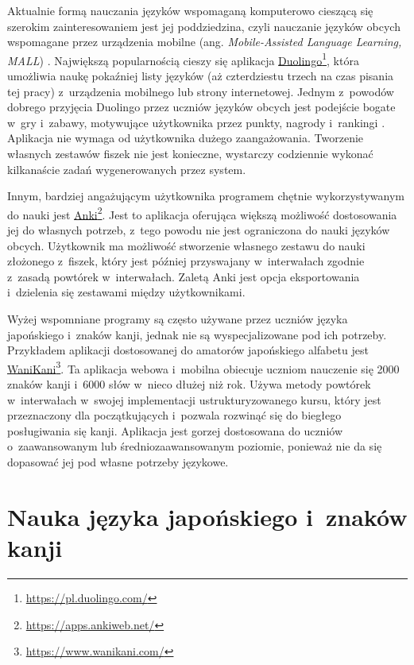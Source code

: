 \documentclass[a4paper,twoside,12pt]{book}
\newcommand{\obcy}[1]{\emph{#1}}
\newcommand{\english}[1]{{\selectlanguage{british}\obcy{#1}}}
\begin{document}
Aktualnie formą nauczania języków wspomaganą komputerowo cieszącą się szerokim zainteresowaniem jest jej poddziedzina, czyli nauczanie języków obcych wspomagane przez urządzenia mobilne (ang. \english{Mobile-Assisted Language Learning, MALL}) \cite{bib:artykulDuolingo}. Największą popularnością \cite{bib:internetDuolingo,bib:artykulDuolingo} cieszy się aplikacja \href{https://pl.duolingo.com/}{Duolingo}\footnote{\url{https://pl.duolingo.com/}}, która umożliwia naukę pokaźniej listy języków (aż czterdziestu trzech na czas pisania tej pracy) z~urządzenia mobilnego lub strony internetowej. Jednym z~powodów dobrego przyjęcia Duolingo przez uczniów języków obcych jest podejście bogate w~gry i~zabawy, motywujące użytkownika przez punkty, nagrody i~rankingi \cite{bib:artykulDuolingo,bib:duolingoHLR}. Aplikacja nie wymaga od użytkownika dużego zaangażowania. Tworzenie własnych zestawów fiszek nie jest konieczne, wystarczy codziennie wykonać kilkanaście zadań wygenerowanych przez system. 

Innym, bardziej angażującym użytkownika programem chętnie wykorzystywanym do nauki jest \href{https://apps.ankiweb.net/}{Anki}\footnote{\url{https://apps.ankiweb.net/}}. Jest to aplikacja oferująca większą możliwość dostosowania jej do własnych potrzeb, z~tego powodu nie jest ograniczona do nauki języków obcych. Użytkownik ma możliwość stworzenie własnego zestawu do nauki złożonego z~fiszek, który jest później przyswajany w~interwałach zgodnie z~zasadą powtórek w~interwałach. Zaletą Anki jest opcja eksportowania i~dzielenia się zestawami między użytkownikami. 

Wyżej wspomniane programy są często używane przez uczniów języka japońskiego i~znaków kanji, jednak nie są wyspecjalizowane pod ich potrzeby. Przykładem aplikacji dostosowanej do amatorów japońskiego alfabetu jest \href{https://www.wanikani.com/}{WaniKani}\footnote{\url{https://www.wanikani.com/}}. Ta aplikacja webowa i~mobilna obiecuje uczniom nauczenie się 2000 znaków kanji i~6000 słów w~nieco dłużej niż rok. Używa metody powtórek w~interwałach w~swojej implementacji ustrukturyzowanego kursu, który jest przeznaczony dla początkujących i~pozwala rozwinąć się do biegłego posługiwania się kanji. Aplikacja jest gorzej dostosowana do uczniów o~zaawansowanym lub średniozaawansowanym poziomie, ponieważ nie da się dopasować jej pod własne potrzeby językowe. 

\section{Nauka języka japońskiego i~znaków kanji}
\end{document}

